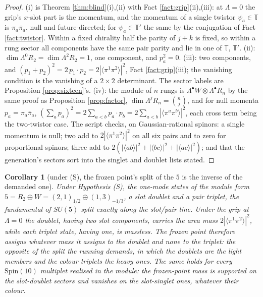 \documentclass[11pt]{article}
\newtheorem{corollary}[theorem]{Corollary}
\theoremstyle{definition}
\newcommand{\T}{\mathbb{T}}
\newcommand{\br}[1]{\langle #1\rangle}
\begin{document}
\begin{proof}
(i) is Theorem \ref{thm:blind}(i),(ii) with Fact \ref{fact:grip}(ii),(iii): at $\Lambda = 0$ the grip's $x$-slot part is the momentum, and the momentum of a single twistor $\psi_{a} \in \T$ is $\pi_{a}\bar\pi_{a}$, null and future-directed; for $\psi_{a} \in \T'$ the same by the conjugation of Fact \ref{fact:twistor}. Within a fixed chirality half the parity of $j + k$ is fixed, so within a rung sector all components have the same pair parity and lie in one of $\T$, $\T'$. (ii): $\dim\Lambda^{0}R_{2} = \dim\Lambda^{2}R_{2} = 1$, one component, and $p_{a}^{2} = 0$. (iii): two components, and $(p_{1} + p_{2})^{2} = 2\,p_{1} \cdot p_{2} = 2|\br{\pi^{1}\pi^{2}}|^{2}$, Fact \ref{fact:grip}(iii); the vanishing condition is the vanishing of a $2 \times 2$ determinant. The sector labels are Proposition \ref{prop:sixteen}'s. (iv): the module of $n$ rungs is $\Lambda^{\bullet}W \otimes \Lambda^{\bullet}R_{n}$ by the same proof as Proposition \ref{prop:factor}, $\dim\Lambda^{j}R_{n} = \binom{n}{j}$, and for null momenta $p_{a} = \pi_{a}\bar\pi_{a}$, $(\sum_{a} p_{a})^{2} = 2\sum_{a<b}p_{a} \cdot p_{b} = 2\sum_{a<b}|\br{\pi^{a}\pi^{b}}|^{2}$, each cross term being the two-twistor case. The script checks, on Gaussian-rational spinors: a single momentum is null; two add to $2|\br{\pi^{1}\pi^{2}}|^{2}$ on all six pairs and to zero for proportional spinors; three add to $2(|\br{ab}|^{2} + |\br{bc}|^{2} + |\br{ac}|^{2})$; and that the generation's sectors sort into the singlet and doublet lists stated.
\end{proof}

\begin{corollary}[under (S), the frozen point's split of the $5$ is the inverse of the demanded one]\label{cor:five}
Under Hypothesis (S), the one-mode states of the module form $5 = R_{2} \oplus W = (2,1)_{1/2} \oplus (1,3)_{-1/3}$, a slot doublet and a pair triplet, the fundamental of $SU(5)$ split exactly along the slot/pair line. Under the grip at $\Lambda = 0$ the doublet, having two slot components, carries the area mass $2|\br{\pi^{1}\pi^{2}}|^{2}$, while each triplet state, having one, is massless. The frozen point therefore assigns whatever mass it assigns to the doublet and none to the triplet: the opposite of the split the running demands, in which the doublets are the light members and the colour triplets the heavy ones. The same holds for every $\mathrm{Spin}(10)$ multiplet realised in the module: the frozen-point mass is supported on the slot-doublet sectors and vanishes on the slot-singlet ones, whatever their colour.
\end{corollary}
\end{document}
